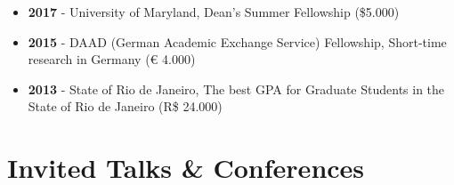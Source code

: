 \documentclass[letterpaper, 11pt]{article}
\begin{document}
\begin{itemize}[leftmargin=.45cm]
        \item \textbf{2017} - University of Maryland, Dean's Summer Fellowship (\$5.000)
        \item \textbf{2015} - DAAD (German Academic Exchange Service) Fellowship,  Short-time research in Germany (\euro{} 4.000)
        \item \textbf{2013} - State of Rio de Janeiro, The best GPA for Graduate Students in the State of Rio de Janeiro (R\$ 24.000)
    \end{itemize}

 \section*{Invited Talks \& Conferences}
\end{document}
